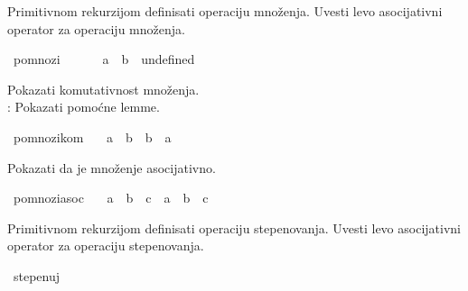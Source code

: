 \begin{isabellebody}
\begin{exercise}[subtitle=Zasnivanje prirodnih brojeva.]
{\isafoldproof}%
%
\isadelimproof
%
\endisadelimproof
%
\begin{isamarkuptext}%
Primitivnom rekurzijom definisati operaciju množenja. Uvesti levo 
      asocijativni operator \isa{{\isasymotimes}} za operaciju množenja.%
\end{isamarkuptext}\isamarkuptrue%
\isamarkupfalse%
\ pomnozi\ {\isacharparenleft}{\kern0pt}\ {\isachardoublequoteopen}{\isasymotimes}{\isachardoublequoteclose}\ {}{}{}{\isacharparenright}{\kern0pt}\ \isanewline
\ \ {\isachardoublequoteopen}a\ {\isasymotimes}\ b\ {\isacharequal}{\kern0pt}\ undefined{\isachardoublequoteclose}%
\begin{isamarkuptext}%
Pokazati komutativnost množenja.\\
     : Pokazati pomoćne lemme.%
\end{isamarkuptext}\isamarkuptrue%
\isamarkupfalse%
\ pomnozi{\isacharunderscore}{\kern0pt}kom{\isacharcolon}{\kern0pt}\isanewline
\ \ \ {\isachardoublequoteopen}a\ {\isasymotimes}\ b\ {\isacharequal}{\kern0pt}\ b\ {\isasymotimes}\ a{\isachardoublequoteclose}\isanewline
\ \ %
\isadelimproof
%
\endisadelimproof
%
\isatagproof
%
\endisatagproof
{\isafoldproof}%
%
\isadelimproof
%
\endisadelimproof
%
\begin{isamarkuptext}%
Pokazati da je množenje asocijativno.%
\end{isamarkuptext}\isamarkuptrue%
\isamarkupfalse%
\ pomnozi{\isacharunderscore}{\kern0pt}asoc{\isacharcolon}{\kern0pt}\isanewline
\ \ \ {\isachardoublequoteopen}a\ {\isasymotimes}\ {\isacharparenleft}{\kern0pt}b\ {\isasymotimes}\ c{\isacharparenright}{\kern0pt}\ {\isacharequal}{\kern0pt}\ a\ {\isasymotimes}\ b\ {\isasymotimes}\ c{\isachardoublequoteclose}\isanewline
\ \ %
\isadelimproof
%
\endisadelimproof
%
\isatagproof
%
\endisatagproof
{\isafoldproof}%
%
\isadelimproof
%
\endisadelimproof
%
\begin{isamarkuptext}%
Primitivnom rekurzijom definisati operaciju stepenovanja. Uvesti levo 
      asocijativni operator \isa{{\isasymZcat}} za operaciju stepenovanja.%
\end{isamarkuptext}\isamarkuptrue%
\isamarkupfalse%
\ stepenuj\ {\isacharparenleft}{\kern0pt}\ {\isachardoublequoteopen}{\isasymZcat}{\isachardoublequoteclose}\ {}{}{}{\isacharparenright}{\kern0pt}\ \isanewline

\end{exercise}
\end{isabellebody}
